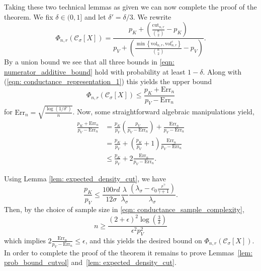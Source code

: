 \documentclass[11pt,twoside]{article}
\newcommand{\set}[1]{\left\{#1\right\}}
\newcommand{\vol}{\mathrm{vol}}
\newcommand{\cut}{\mathrm{cut}}
\newcommand{\1}{\mathbf{1}}
\newcommand{\Err}{\mathrm{Err}}
\newcommand{\Xbf}{X}             %
\newcommand{\Cset}{\mathcal{C}}
\newcommand{\Csig}{\Cset_{\sigma}}
\begin{document}
Taking these two technical lemmas as given we can now complete the proof of the theorem. 
We fix $\delta \in (0,1]$ and let $\delta' = \delta/3$. We rewrite
\begin{equation}
\label{eqn: conductance_representation_1}
\Phi_{n,r}(\Csig[\Xbf]) = \frac{p_K + \left(\frac{\cut_{n,r}}{{n \choose 2}} - p_K\right)}{p_V + \left(\frac{\min\set{\vol_{n,r}, \vol_{n,r}^c}}{{n \choose 2}} - p_V\right)}.
\end{equation}
By a union bound we see that all three bounds in \eqref{eqn: numerator_additive_bound} hold with probability at least $1 - \delta$. Along with (\ref{eqn: conductance_representation_1}) this yields the upper bound
\begin{equation*}
\Phi_{n,r}(\Csig[\Xbf]) \leq \frac{p_K + \Err_n}{p_V - \Err_n}
\end{equation*}
for $\Err_n = \sqrt{\frac{\log(1/\delta')}{n}}$.
Now, some straightforward algebraic manipulations yield,
\begin{align*}
\frac{p_K + \Err_n}{p_V - \Err_n} & = \frac{p_K}{p_V} \left(\frac{p_V}{p_V - \Err_n}\right) + \frac{\Err_n}{p_V - \Err_n} \\
& = \frac{p_K}{p_V} + \left(\frac{p_K}{p_V} + 1\right)\frac{\Err_n}{p_V - \Err_n} \\
& \leq \frac{p_K}{p_V} + 2 \frac{\Err_n}{p_V - \Err_n}.
\end{align*}


\noindent Using Lemma \ref{lem: expected_density_cut}, we have
\begin{equation*}
\frac{p_K}{p_V} \leq \frac{100rd}{12\sigma} \frac{\lambda}{\lambda_{\sigma}} \frac{\left(\lambda_{\sigma} - c_0\frac{r^{\gamma}}{\gamma + 1}\right)}{\lambda_{\sigma}}.
\end{equation*}
Then, by the choice of sample size in \eqref{eqn: conductance_sample_complexity}, 
\begin{equation*}
n \geq \frac{(2 + \epsilon)^2 \log\left(\frac{3}{\delta}\right)}{\epsilon^2 p_V^2}
\end{equation*}
which implies $2 \frac{\Err_n}{p_V - \Err_n} \leq \epsilon$, and this yields the desired bound on $\Phi_{n,r}(\Csig[X])$. In order to complete the proof of
the theorem it remains to prove Lemmas~\ref{lem: prob_bound_cutvol} and~\ref{lem: expected_density_cut}.
\end{document}
